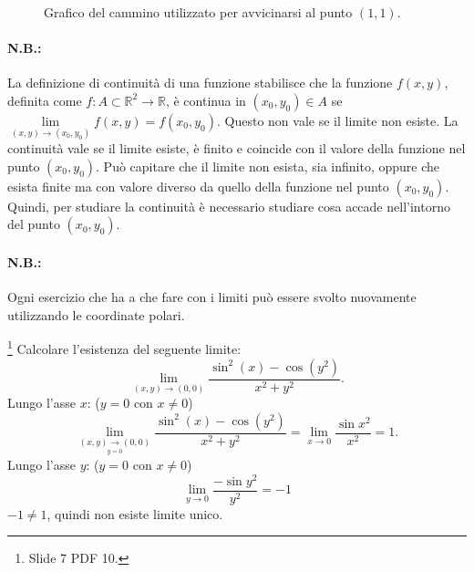 \begin{example}
\begin{figure}
    \caption{Grafico del cammino utilizzato per avvicinarsi al punto $(1,1)$.}\label{fig:esempio_f_1_y}
    \end{figure}
\end{example}

\paragraph{N.B.:} La definizione di continuità di una funzione stabilisce che la funzione $f(x,y)$, definita come $f\colon A\subset\mathbb R^2\rightarrow\mathbb R$, è continua in $(x_0, y_0)\in A$ se $\lim\limits_{(x, y)\rightarrow (x_0,y_0)}f(x,y)=f(x_0, y_0)$. Questo non vale se il limite non esiste. La continuità vale se il limite esiste, è finito e coincide con il valore della funzione nel punto $(x_0, y_0)$. Può capitare che il limite non esista, sia infinito, oppure che esista finite ma con valore diverso da quello della funzione nel punto $(x_0, y_0)$. Quindi, per studiare la continuità è necessario studiare cosa accade nell'intorno del punto $(x_0, y_0)$.

\paragraph{N.B.:} Ogni esercizio che ha a che fare con i limiti può essere svolto nuovamente utilizzando le coordinate polari.

\begin{example}\footnote{Slide 7 PDF 10.}
    Calcolare l'esistenza del seguente limite:
    \begin{equation*}
        \lim\limits_{(x,y)\rightarrow(0,0)}\frac{\sin^2(x)-\cos(y^2)}{x^2+y^2}.
    \end{equation*}
    Lungo l'asse $x$: ($y=0$ con $x\neq 0$)
    \begin{equation*}
        \lim\limits_{\underset{y=0}{(x,y)\rightarrow(0,0)}}\frac{\sin^2(x)-\cos(y^2)}{x^2+y^2}=\lim\limits_{x\rightarrow 0}\frac{\sin x^2}{x^2}=1.
    \end{equation*}
    Lungo l'asse $y$: ($y=0$ con $x\neq 0$)
    \begin{equation*}
        \lim\limits_{y\rightarrow 0}\frac{-\sin y^2}{y^2}=-1
    \end{equation*}
    $-1\neq 1$, quindi non esiste limite unico.
\end{example}

